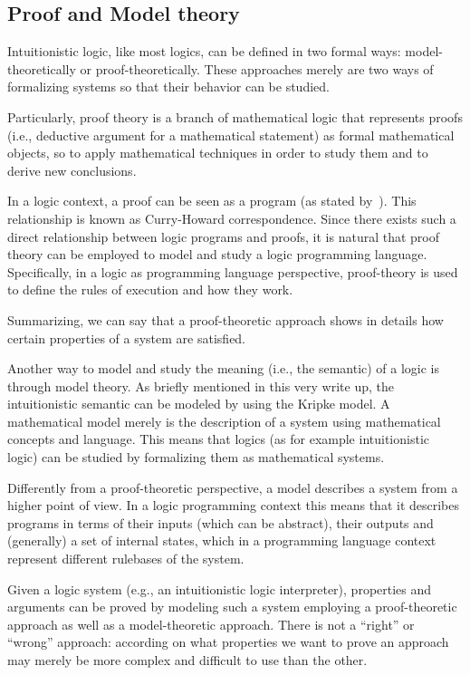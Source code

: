 \begin{appendices}
  \section{Proof and Model theory}
  Intuitionistic logic, like most logics, can be defined in two formal ways:
  model-theoretically or proof-theoretically.
  These approaches merely are two ways of formalizing systems so that
  their behavior can be studied.

  Particularly, proof theory is a branch of mathematical logic that represents proofs (i.e.,
  deductive argument for a mathematical statement) as formal
  mathematical objects, so to apply mathematical techniques in
  order to study them and to derive new conclusions.

  In a logic context, a proof can be seen as a program (as stated by~\cite{PropAsTypes}).
  This relationship is known as Curry-Howard correspondence. Since there exists
  such a direct relationship between logic programs and proofs, it is
  natural that proof theory can be employed to model and study a logic programming
  language. Specifically, in a logic as programming language perspective,
  proof-theory is used to define the rules of execution and how they work.

  Summarizing, we can say that a proof-theoretic approach shows in details how certain
  properties of a system are satisfied.

  Another way to model and study the meaning (i.e., the semantic) of a logic is through model
  theory. As briefly mentioned in this very write up, the intuitionistic semantic can be
  modeled by using the Kripke model. A mathematical model merely is the description of
  a system using mathematical concepts and language. This means that logics
  (as for example intuitionistic logic) can be studied by formalizing them as
  mathematical systems.

  Differently from a proof-theoretic perspective, a model describes a system from a
  higher point of view. In a logic programming context this means that it describes
  programs in terms of their inputs (which can be abstract), their outputs
  and (generally) a set of internal states, which in a programming language context
  represent different rulebases of the system.

  Given a logic system (e.g., an intuitionistic logic interpreter), properties and
  arguments can be proved by modeling such a system employing a proof-theoretic approach
  as well as a model-theoretic approach.
  There is not a ``right'' or ``wrong'' approach: according on what properties we want to prove
  an approach may merely be more complex and difficult to use than the other.


\end{appendices}
